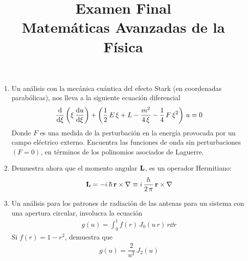 
\author{}
\title{Examen Final \\ \large{Matemáticas Avanzadas de la Física}\vspace{-50pt}}
\date{ }

\renewcommand\labelenumii{\theenumi.{\arabic{enumii})}}
\maketitle
\fontsize{14}{14}\selectfont
\begin{enumerate}
\item Un análisis con la mecánica cuántica del efecto Stark (en coordenadas parabólicas), nos lleva a la siguiente ecuación diferencial
\begin{align*}
\dv{\xi} \left( \xi \, \dv{u}{\xi}  \right) + \left( \dfrac{1}{2} \, E \, \xi + L - \dfrac{m^{2}}{4 \, \xi} - \dfrac{1}{4} \, F \, \xi^{2} \right) \, u = 0
\end{align*}
Donde $F$ es una medida de la perturbación en la energía provocada por un campo eléctrico externo. Encuentra las funciones de onda sin perturbaciones $(F=0)$, en términos de los polinomios asociados de Laguerre.
\item Demuestra ahora que el momento angular $\vb{L}$, es un operador Hermitiano:
\[ \vb{L} = - i\, \hbar \, \vb{r} \times \nabla \equiv i \, \dfrac{h}{2 \, \pi} \, \vb{r} \times \nabla \]
\item Un análisis para los patrones de radiación de las antenas para un sistema con una apertura circular, involucra la ecuación
\begin{align*}
g(u) = \int_{0}^{1} f(r) \, J_{0} (u \, r) \, r \dd{r}
\end{align*}
Si $f(r) = 1 - r^{2}$, demuestra que
\begin{align*}
g(u) = \dfrac{2}{u^{2}} \, J_{2}(u)
\end{align*}

\end{enumerate}
